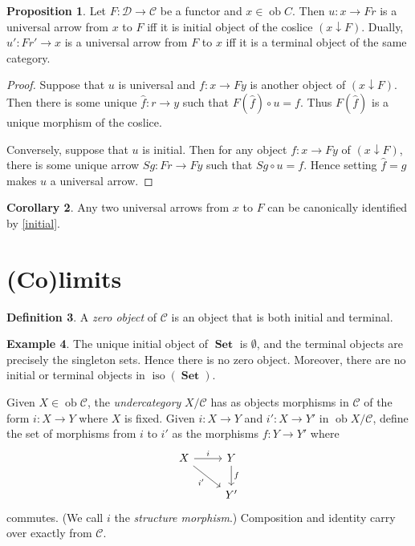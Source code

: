 \documentclass[10pt,letterpaper,cm]{nupset}
\theoremstyle{definition}
\newtheorem{definition}{Definition}[section]
\newtheorem{exmp}[definition]{Example}
\theoremstyle{theorem}
\newtheorem{corollary}[definition]{Corollary}
\newtheorem{prop}[definition]{Proposition}
\theoremstyle{remark}
\newcommand{\1}{\mathbf{1}}
\renewcommand{\c}{\mathscr{C}}
\renewcommand{\d}{\mathscr{D}}
\newcommand{\0}{\vec 0}
\DeclareMathOperator{\ob}{ob}
\DeclareMathOperator{\iso}{iso}
\DeclareMathOperator{\set}{\mathbf{Set}}
\begin{document}
\begin{prop}
Let $F : \d \to \c$ be a functor and $x \in \ob C$. Then $u : x \to Fr$ is a universal arrow from $x$ to $F$ iff it is initial object of the coslice $\left(x \downarrow F\right)$. Dually, $u' : Fr' \to x$ is a universal arrow from $F$ to $x$  iff it is a terminal object of the same category.
\end{prop}
\begin{proof}
Suppose that $u$ is universal and $f: x \to Fy$ is another object of $\left(x \downarrow F\right)$. Then there is some unique $\hat{f}: r \to y$ such that $F\left(\hat{f}\right) \circ u = f$. Thus $F\left(\hat{f}\right)$ is a unique morphism of the coslice.

\smallskip

Conversely, suppose that $u$ is initial. Then for any object $f: x \to Fy$ of $\left(x \downarrow F\right)$, there is some unique arrow $Sg : Fr \to Fy$ such that $Sg \circ u = f$. Hence setting $\hat{f} = g$ makes $u$ a universal arrow.
\end{proof}

\begin{corollary}
Any two universal arrows from $x$ to $F$ can be canonically identified by \cref{initial}.
\end{corollary}

\section{(Co)limits}

\begin{definition}
A \textit{zero object} of $\c$ is an object that is both initial and terminal.
\end{definition}

\begin{exmp}
The unique initial object of $\set$ is $\emptyset$, and the terminal objects are precisely the singleton sets. Hence there is no zero object. Moreover, there are no initial or terminal objects in $\iso(\set)$.
\end{exmp}


Given $X \in \ob \c$, the \textit{undercategory} ${X}/{\c}$ has as objects morphisms in $\c$ of the form $i : X \to Y$ where $X$ is fixed. Given $i: X \to Y$ and  $i' : X \to Y'$ in $\ob {X}/{\c}$, define the set of morphisms from $i$ to $i'$ as the morphisms $f: Y \to Y'$ where
\[ \begin{tikzcd}
X \arrow[r, "i"] \arrow[swap, dr,  " i' "] & Y \arrow[d, "f"] \\%
 & Y'
\end{tikzcd}
\]
commutes. (We call $i$ the \textit{structure morphism}.)
 Composition and identity carry over exactly from $\c$.
\end{document}
